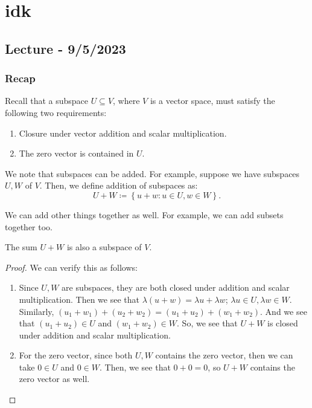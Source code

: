 \documentclass[openany]{book}
\begin{document}
	\chapter{idk}
	\section{Lecture - 9/5/2023}
	\subsection{Recap}
	Recall that a subspace $U \subseteq V$, where $V$ is a vector space, must satisfy the following two requirements:
	\begin{enumerate}
		\item Closure under vector addition and scalar multiplication.
		\item The zero vector is contained in $U$.
	\end{enumerate}
	
	We note that subspaces can be added. For example, suppose we have subspaces $U, W$ of $V$. Then, we define addition of subspaces as:
	\begin{equation*}
		U + W \coloneq \left\{  u + w : u \in U, w \in W \right\}.
	\end{equation*}
	
	\begin{rmk}
		We can add other things together as well. For example, we can add subsets together too.
	\end{rmk}
	
	\begin{thm}
		The sum $U+W$ is also a subspace of $V$.
	\end{thm}
	\begin{proof}
		We can verify this as follows:
		\begin{enumerate}
			\item Since $U, W$ are subspaces, they are both closed under addition and scalar multiplication. Then we see that $\lambda(u + w) = \lambda u + \lambda w$; $\lambda u \in U, \lambda w \in W$. Similarly, $(u_{1} + w_{1}) + (u_{2} + w_{2}) = (u_{1} + u_{2}) + (w_{1} + w_{2})$. And we see that $(u_{1} + u_{2}) \in U$ and $(w_{1} + w_{2}) \in W$. So, we see that $U+W$ is closed under addition and scalar multiplication.
			
			\item For the zero vector, since both $U, W$ contains the zero vector, then we can take $0 \in U$ and $0 \in W$. Then, we see that $0 + 0 = 0$, so $U+W$ contains the zero vector as well.
		\end{enumerate}
	\end{proof}
	
\end{document}
